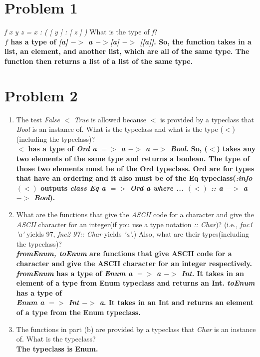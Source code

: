 \documentclass[a4paper, 12pt,fleqn]{article}
\begin{document}
\section*{Problem 1}
\textit{f x y z = x : ( [ y ] : [ z ] )} What is the type of \textit{f}?\\
\textbf{
$f$ has a type of \textit{[a] $->$ a $->$[a] $->$ [[a]]}. So, the function takes in a list, an element, and another list, which are all of the same type. The function then returns a list of a list of the same type.
}
\section*{Problem 2}
\begin{enumerate}[label=(\alph*)]
\item The test \textit{False $<$ True} is allowed because $<$ is provided by a typeclass that \textit{Bool} is an instance of. What is the typeclass and what is the type ($<$)(including the typeclass)?\\
\textbf{
$<$ has a type of \textit{Ord a $=>$ a $->$ a $->$ Bool}. So, ($<$) takes any two elements of the same type and returns a boolean. The type of those two elements must be of the Ord typeclass. Ord are for types that have an ordering and it also must be of the Eq typeclass(\textit{:info $(<)$} outputs \textit{class Eq a $=>$ Ord a where ... $(<)$ :: a $->$ a $->$ Bool}).
}
\item What are the functions that give the \textit{ASCII} code for a character and give the \textit{ASCII} character for an integer(if you use a type notation \textit{:: Char})? (i.e., \textit{fnc1 'a'} yields 97, \textit{fnc2 97:: Char} yields \textit{'a'}.) Also, what are their types(including the typeclass)?\\
\textbf{
\textit{fromEnum, toEnum} are functions that give ASCII code for a character and give the ASCII character for an integer respectively. \textit{fromEnum} has a type of \textit{Enum a $=>$ a $->$ Int}. It takes in an element of a type from Enum typeclass and returns an Int. \textit{toEnum} has a type of \\ \textit{Enum a $=>$ Int $->$ a}. It takes in an Int and returns an element of a type from the Enum typeclass.
}
\item The functions in part (b) are provided by a typeclass that \textit{Char} is an instance of. What is the typeclass?\\
\textbf{
The typeclass is Enum.
}
\end{enumerate}
\end{document}
